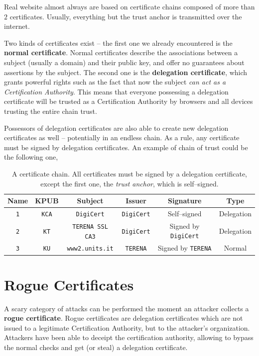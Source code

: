 \documentclass[10pt]{extbook}
\begin{document}
Real website almost always are based on certificate chains composed of more
than $2$ certificates. Usually, everything but the trust anchor is transmitted
over the internet.

Two kinds of certificates exist -- the first one we already encountered is the
\textbf{normal certificate}. Normal certificates describe the associations
between a subject (usually a domain) and their public key, and offer no
guarantees about assertions by the subject. The second one is the
\textbf{delegation certificate}, which grants powerful rights such as the fact
that now the subject \emph{can act as a Certification Authority}. This means
that everyone possessing a delegation certificate will be trusted as a
Certification Authority by browsers and all devices trusting the entire chain
trust.

Possessors of delegation certificates are also able to create new delegation
certificates as well -- potentially in an endless chain. As a rule, any
certificate must be signed by delegation certificates. An example of chain of
trust could be the following one,

\begin{table}[ht]
\centering
\begin{tabular}{cccccc}
    \textbf{Name} & \textbf{KPUB} & \textbf{Subject} & \textbf{Issuer} & \textbf{Signature} & \textbf{Type} \\
    \hline
    \texttt{1} & \texttt{KCA} & \texttt{DigiCert} & \texttt{DigiCert} & Self--signed  & Delegation \\
    \texttt{2} & \texttt{KT} & \texttt{TERENA SSL CA3} & \texttt{DigiCert} & Signed by \texttt{DigiCert} & Delegation \\
    \texttt{3} & \texttt{KU} & \texttt{www2.units.it} & \texttt{TERENA} & Signed by \texttt{TERENA} & Normal
\end{tabular}
\caption{A certificate chain. All certificates must be signed by a delegation
certificate, except the first one, the \emph{trust anchor}, which is
self--signed.}\label{tab:certificateChain1}
\end{table}
\bigskip

\section{Rogue Certificates}

A scary category of attacks can be performed the moment an attacker collects a
\textbf{rogue certificate}. Rogue certificates are delegation certificates
which are not issued to a legitimate Certification Authority, but to the
attacker's organization. Attackers have been able to deceipt the certification
authority, allowing to bypass the normal checks and get (or steal) a delegation
certificate.
\end{document}
